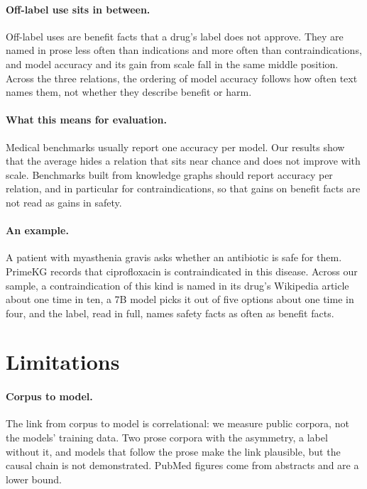 \documentclass[letterpaper]{article} %
\begin{document}
\paragraph{Off-label use sits in between.}
Off-label uses are benefit facts that a drug's label does not approve. They are
named in prose less often than indications and more often than
contraindications, and model accuracy and its gain from scale fall in the same
middle position. Across the three relations, the ordering of model accuracy
follows how often text names them, not whether they describe benefit or harm.

\paragraph{What this means for evaluation.}
Medical benchmarks usually report one accuracy per model. Our results show that
the average hides a relation that sits near chance and does not improve with
scale. Benchmarks built from knowledge graphs should report accuracy per
relation, and in particular for contraindications, so that gains on benefit
facts are not read as gains in safety.

\paragraph{An example.}
A patient with myasthenia gravis asks whether an antibiotic is safe for them.
PrimeKG records that ciprofloxacin is contraindicated in this disease. Across
our sample, a contraindication of this kind is named in its drug's Wikipedia
article about one time in ten, a 7B model picks it out of five options about
one time in four, and the label, read in full, names safety facts as often as
benefit facts.

\section{Limitations}

\paragraph{Corpus to model.} The link from corpus to model is correlational:
we measure public corpora, not the models' training data. Two prose corpora
with the asymmetry, a label without it, and models that follow the prose make
the link plausible, but the causal chain is not demonstrated. PubMed figures
come from abstracts and are a lower bound.
\end{document}
